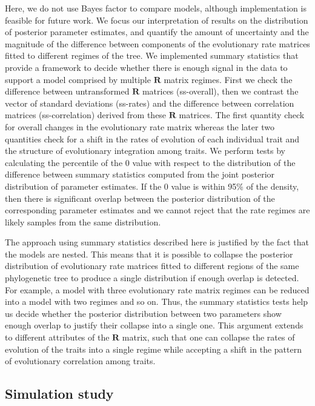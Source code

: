 Here, we do not use Bayes factor to compare models, although implementation is feasible for future work. We focus our interpretation of results on the distribution of posterior parameter estimates, and quantify the amount of uncertainty and the magnitude of the difference between components of the evolutionary rate matrices fitted to different regimes of the tree. We implemented summary statistics that provide a framework to decide whether there is enough signal in the data to support a model comprised by multiple $\mathbf{R}$ matrix regimes. First we check the difference between untransformed $\mathbf{R}$ matrices (ss-overall), then we contrast the vector of standard deviations (ss-rates) and the difference between correlation matrices (ss-correlation) derived from these $\mathbf{R}$ matrices. The first quantity check for overall changes in the evolutionary rate matrix whereas the later two quantities check for a shift in the rates of evolution of each individual trait and the structure of evolutionary integration among traits. We perform tests by calculating the percentile of the 0 value with respect to the distribution of the difference between summary statistics computed from the joint posterior distribution of parameter estimates. If the 0 value is within 95\% of the density, then there is significant overlap between the posterior distribution of the corresponding parameter estimates and we cannot reject that the rate regimes are likely samples from the same distribution.

The approach using summary statistics described here is justified by the fact that the models are nested. This means that it is possible to collapse the posterior distribution of evolutionary rate matrices fitted to different regions of the same phylogenetic tree to produce a single distribution if enough overlap is detected.  For example, a model with three evolutionary rate matrix regimes can be reduced into a model with two regimes and so on. Thus, the summary statistics tests help us decide whether the posterior distribution between two parameters show enough overlap to justify their collapse into a single one. This argument extends to different attributes of the $\mathbf{R}$ matrix, such that one can collapse the rates of evolution of the traits into a single regime while accepting a shift in the pattern of evolutionary correlation among traits.

\subsection{Simulation study}

